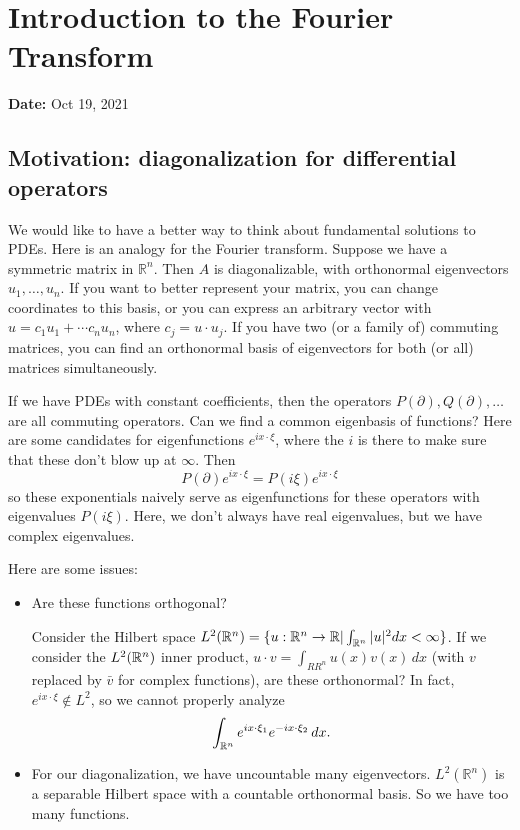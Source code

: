 \newpage 
\section{Introduction to the Fourier Transform}
\textbf{Date:} Oct 19, 2021

\subsection{Motivation: diagonalization for differential operators}

We would like to have a better way to think about fundamental solutions to PDEs. Here is an analogy for the Fourier transform. Suppose we have a symmetric matrix in $\mathbb{R}^{n}$. Then $A$ is diagonalizable, with orthonormal eigenvectors $u_{1}, \ldots, u_{n} .$ If you want to better represent your matrix, you can change coordinates to this basis, or you can express an arbitrary vector with $u=c_{1} u_{1}+\cdots c_{n} u_{n}$, where $c_{j}=u \cdot u_{j} .$ If you have two (or a family of) commuting matrices, you can find an orthonormal basis of eigenvectors for both (or all) matrices simultaneously.

If we have PDEs with constant coefficients, then the operators $P(\partial), Q(\partial), \ldots$ are all commuting operators. Can we find a common eigenbasis of functions? Here are some candidates for eigenfunctions $e^{i x \cdot \xi}$, where the $i$ is there to make sure that these don't blow up at $\infty .$ Then
$$
P(\partial) e^{i x \cdot \xi}=P(i \xi) e^{i x \cdot \xi}
$$
so these exponentials naively serve as eigenfunctions for these operators with eigenvalues $P(i \xi)$. Here, we don't always have real eigenvalues, but we have complex eigenvalues.

Here are some issues:
\begin{itemize}
    \item Are these functions orthogonal? 
    
    Consider the Hilbert space $L^2(\mathbb{R}^n) = \{u:\mathbb{R}^n \to \mathbb{R}| \int_{\mathbb{R}^n}|u|^2 dx < \infty\}$. If we consider the $L^2(\mathbb{R}^n)$ inner product, $u\cdot v=\int_{RR^n}u(x)v(x)\,dx$ (with $v$ replaced by $\bar v$ for complex functions), are these orthonormal? In fact, $e^{ix\cdot \xi}\notin L^2$, so we cannot properly analyze 
    \[
        \int_{\mathbb{R}^n}e^{ix\cdot \xi_1} e^{-ix \cdot \xi_2}\,dx.
    \]
    \item For our diagonalization, we have uncountable many eigenvectors. $L^{2}\left(\mathbb{R}^{n}\right)$ is a separable Hilbert space with a countable orthonormal basis. So we have too many functions.
\end{itemize}

